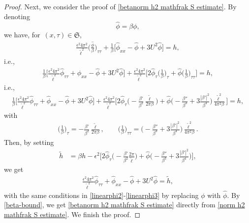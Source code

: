 \documentclass[10pt, reqno]{amsart}
\numberwithin{equation}{section}
\theoremstyle{definition}
\begin{document}
{{\begin{proof}
 Next, we consider the proof of \eqref{betanorm h2 mathfrak S estimate}.
By denoting \[ \hat\phi = \beta \phi, \] we have,
for $\,(x, \tau)\in \mathfrak S$,
\begin{align*}
 \frac{\epsilon^2 4\pi^2}{{\tilde\ell}^2} \Big(\frac{\hat\phi} {\beta} \Big)_{\tau\tau} + \frac1\beta\Big[\hat\phi_{xx} - \hat\phi+3U^2 \hat\phi \Big]= h,
\end{align*}
i.e.,
\begin{align*}
\frac1\beta\Big[ \frac{\epsilon^2 4\pi^2}{{\tilde\ell}^2} \hat\phi_{\tau\tau} + \hat\phi_{xx} - \hat\phi+3U^2 \hat\phi \Big] + \frac{\epsilon^2 4\pi^2}{{\tilde\ell}^2}\Big[2\hat\phi_\tau \Big(\frac1\beta \Big)_\tau + \hat\phi \Big(\frac1\beta \Big)_{\tau\tau} \Big] = h,
\end{align*}
i.e.,
\begin{align*}
\frac1\beta\Big[ \frac{\epsilon^2 4\pi^2}{{\tilde\ell}^2} \hat\phi_{\tau\tau} + \hat\phi_{xx} - \hat\phi+3U^2 \hat\phi \Big] + \frac{\epsilon^2 4\pi^2}{{\tilde\ell}^2}\Big[2\hat\phi_\tau \Big(-\frac{\beta'}{\beta^2} \frac{\tilde \ell} {2\pi \beta}\Big) + \hat\phi \Big(-\frac{\beta''} {\beta^3} +3\frac{|\beta'|^2} {\beta^4} \Big)\frac{\tilde \ell^2} {4\pi^2\beta} \Big] = h,
\end{align*}
with
\begin{align*}
\Big(\frac1\beta \Big)_\tau = -\frac{\beta'}{\beta^2} \frac{\tilde \ell} {2\pi \beta},
\qquad
\Big(\frac1\beta \Big)_{\tau\tau} = \Big(-\frac{\beta''} {\beta^3} +3\frac{|\beta'|^2} {\beta^4} \Big)\frac{\tilde \ell^2} {4\pi^2\beta}.
\end{align*}
Then, by setting
\begin{align*}
 \tilde h
& =\beta h - \epsilon^2\Big[2\hat\phi_\tau \Big(-\frac{\beta'}{\beta^2} \frac{2\pi}{\tilde \ell} \Big) + \hat\phi \Big(-\frac{\beta''} {\beta^3} +3\frac{|\beta'|^2} {\beta^4} \Big) \Big],
\end{align*}
 we get
\begin{align*}
\frac{\epsilon^2 4\pi^2}{{\tilde\ell}^2} \hat\phi_{\tau\tau} + \hat\phi_{xx} - \hat\phi+3U^2 \hat\phi = \tilde h,
\end{align*}
with the same conditions in \eqref{linearphi2}-\eqref{linearphi3} by replacing $\phi$ with $\hat\phi$.
By \eqref{beta-bound}, we get \eqref{betanorm h2 mathfrak S estimate} directly from \eqref{norm h2 mathfrak S estimate}.
We finish the proof.
\end{proof}




}}
\end{document}
